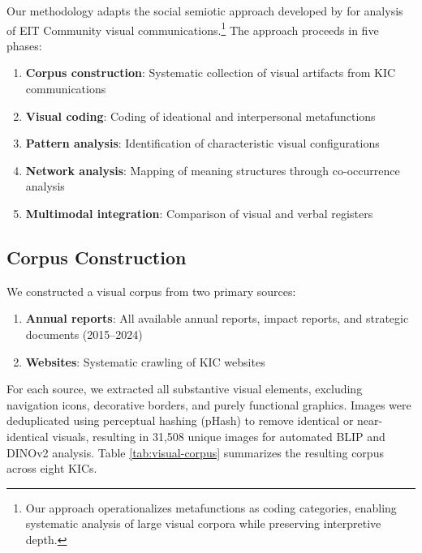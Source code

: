 \documentclass[../main.tex]{subfiles}
\begin{document}
Our methodology adapts the social semiotic approach developed by \cite{jancsary2018institutions} for analysis of EIT Community visual communications.\footnote{Our approach operationalizes metafunctions as coding categories, enabling systematic analysis of large visual corpora while preserving interpretive depth.} The approach proceeds in five phases:

\begin{enumerate}
    \item \textbf{Corpus construction}: Systematic collection of visual artifacts from KIC communications
    \item \textbf{Visual coding}: Coding of ideational and interpersonal metafunctions
    \item \textbf{Pattern analysis}: Identification of characteristic visual configurations
    \item \textbf{Network analysis}: Mapping of meaning structures through co-occurrence analysis
    \item \textbf{Multimodal integration}: Comparison of visual and verbal registers
\end{enumerate}

\subsection{Corpus Construction}

We constructed a visual corpus from two primary sources:
\begin{enumerate}
    \item \textbf{Annual reports}: All available annual reports, impact reports, and strategic documents (2015--2024)
    \item \textbf{Websites}: Systematic crawling of KIC websites
\end{enumerate}

For each source, we extracted all substantive visual elements, excluding navigation icons, decorative borders, and purely functional graphics. Images were deduplicated using perceptual hashing (pHash) to remove identical or near-identical visuals, resulting in 31,508 unique images for automated BLIP and DINOv2 analysis. Table \ref{tab:visual-corpus} summarizes the resulting corpus across eight KICs.
\end{document}
